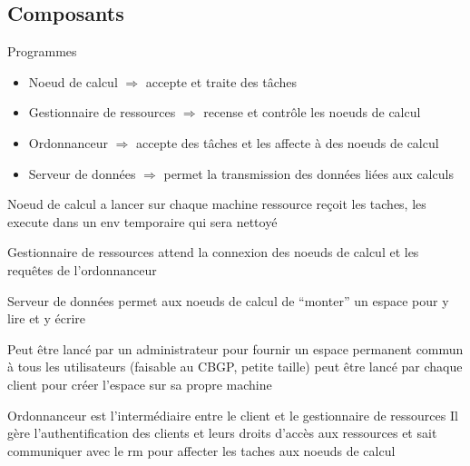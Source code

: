 \documentclass[handout]{beamer}
\begin{document}
\subsection{Composants}
\begin{frame}{Programmes}
    \begin{block}
        
    \begin{itemize}
        \item Noeud de calcul $\Longrightarrow$ accepte et traite des t\^aches
        \item Gestionnaire de ressources $\Longrightarrow$ recense et contrôle les noeuds de calcul
        \item Ordonnanceur $\Longrightarrow$ accepte des t\^aches et les affecte à des noeuds de calcul
        \item Serveur de données $\Longrightarrow$ permet la transmission des données liées aux calculs
    \end{itemize}
    \end{block}
\end{frame}

\begin{frame}{Noeud de calcul}
     a lancer sur chaque machine ressource
     reçoit les taches, les execute dans un env temporaire qui sera nettoyé
\end{frame}

\begin{frame}{Gestionnaire de ressources}
     attend la connexion des noeuds de calcul et les requêtes de l'ordonnanceur
    
\end{frame}

\begin{frame}{Serveur de données}
     permet aux noeuds de calcul de ``monter'' un espace pour y lire et y écrire

     Peut être lancé par un administrateur pour fournir un espace permanent commun à tous les utilisateurs (faisable au CBGP, petite taille)
     peut être lancé par chaque client pour créer l'espace sur sa propre machine
    
\end{frame}

\begin{frame}{Ordonnanceur}
     est l'intermédiaire entre le client et le gestionnaire de ressources
     Il gère l'authentification des clients et leurs droits d'accès aux ressources 
     et sait communiquer avec le rm pour affecter les taches aux noeuds de calcul
    
\end{frame}
\end{document}
